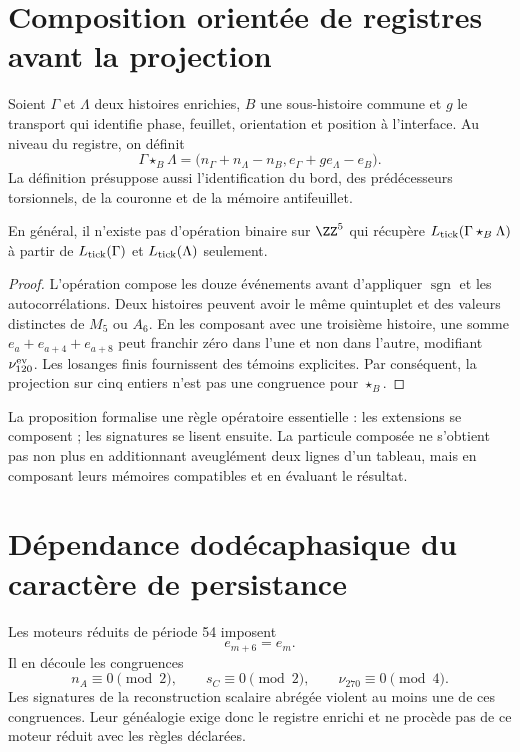 \section{Composition orientée de registres avant la projection}

Soient \(\Gamma\) et \(\Lambda\) deux histoires enrichies, \(B\) une
sous-histoire commune et \(g\) le transport qui identifie phase, feuillet,
orientation et position à l'interface. Au niveau du registre, on définit
\[
 \boxed{
 \Gamma\star_B\Lambda
 =\bigl(n_\Gamma+n_\Lambda-n_B,
        e_\Gamma+g e_\Lambda-e_B\bigr).}
\]
La définition présuppose aussi l'identification du bord, des
prédécesseurs torsionnels, de la couronne et de la mémoire antifeuillet.

\begin{proposition}
\label{prop:no-descenso-empalme-cinco}
En général, il n'existe pas d'opération binaire sur \(\ZZ^5\) qui récupère
\(L_{\rm tick}(\Gamma\star_B\Lambda)\) à partir de
\(L_{\rm tick}(\Gamma)\) et \(L_{\rm tick}(\Lambda)\) seulement.
\end{proposition}

\begin{proof}
L'opération compose les douze événements avant d'appliquer
\(\operatorname{sgn}\) et les autocorrélations. Deux histoires peuvent avoir
le même quintuplet et des valeurs distinctes de \(M_5\) ou \(A_6\). En les composant
avec une troisième histoire, une somme
\(e_a+e_{a+4}+e_{a+8}\) peut franchir zéro dans l'une et non dans l'autre, modifiant
\(\nu_{120}^{\rm ev}\). Les losanges finis fournissent des témoins explicites.
Par conséquent, la projection sur cinq entiers n'est pas
une congruence pour \(\star_B\).
\end{proof}

La proposition formalise une règle opératoire essentielle : les extensions se
composent ; les signatures se lisent ensuite. La particule composée ne
s'obtient pas non plus en additionnant aveuglément deux lignes d'un tableau, mais en composant leurs mémoires
compatibles et en évaluant le résultat.

\section{Dépendance dodécaphasique du caractère de persistance}

Les moteurs réduits de période 54 imposent
\[
 e_{m+6}=e_m.
\]
Il en découle les congruences
\[
 n_A\equiv0\pmod2,
 \qquad
 s_C\equiv0\pmod2,
 \qquad
 \nu_{270}\equiv0\pmod4.
\]
Les signatures de la reconstruction scalaire abrégée violent au moins une de
ces congruences. Leur généalogie exige donc le registre enrichi et
ne procède pas de ce moteur réduit avec les règles déclarées.

